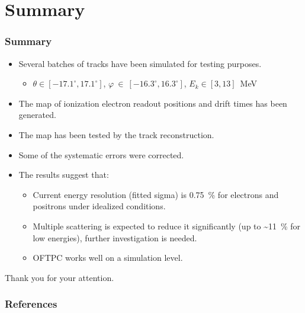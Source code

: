 \documentclass{beamer}
\renewcommand{\textapprox}{{\textasciitilde}}
\begin{document}
	\section{Summary}	
	\begin{frame}
		\frametitle{Summary}
		\begin{itemize}
			\item Several batches of tracks have been simulated for testing purposes.
			\begin{itemize}
				\item $\theta\in[-17.1^\circ,17.1^\circ]$, $\varphi~\in~[-16.3^\circ,16.3^\circ]$, $ E_k \in [3,13] $~MeV
			\end{itemize}
			\item The map of ionization electron readout positions and drift times has been generated.
			\item The map has been tested by the track reconstruction.
			\item Some of the systematic errors were corrected.
			\item The results suggest that:
			\begin{itemize}
				\item Current energy resolution (fitted sigma) is 0.75~\% for electrons and positrons under idealized conditions.
				\item Multiple scattering is expected to reduce it significantly (up to \textapprox 11~\% for low energies), further investigation is needed.
				\item OFTPC works well on a simulation level.
			\end{itemize}
		\end{itemize}
	\end{frame}
	
	{
		\begin{frame}[noframenumbering]{}
			\begin{center}
				\Huge Thank you for your attention.
			\end{center}
		\end{frame}
	}
	
	\begin{frame}
		\frametitle{References}
		\printbibliography
	\end{frame}
	
\end{document}
